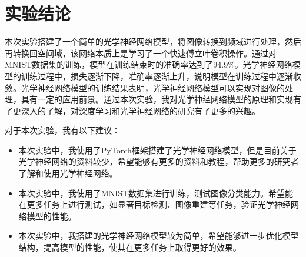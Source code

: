 \section{实验结论}

本次实验搭建了一个简单的光学神经网络模型，将图像转换到频域进行处理，然后再转换回空间域，该网络本质上是学习了一个快速傅立叶卷积操作。通过对MNIST数据集的训练，模型在训练结束时的准确率达到了94.9\%。光学神经网络模型的训练过程中，损失逐渐下降，准确率逐渐上升，说明模型在训练过程中逐渐收敛。光学神经网络模型的训练结果表明，光学神经网络模型可以实现对图像的处理，具有一定的应用前景。通过本次实验，我对光学神经网络模型的原理和实现有了更深入的了解，对深度学习和光学神经网络的研究有了更多的兴趣。

对于本次实验，我有以下建议：

\begin{itemize}
    \item 本次实验中，我使用了PyTorch框架搭建了光学神经网络模型，但是目前关于光学神经网络的资料较少，希望能够有更多的资料和教程，帮助更多的研究者了解和使用光学神经网络。
    \item 本次实验中，我使用了MNIST数据集进行训练，测试图像分类能力。希望能在更多任务上进行测试，如显著目标检测、图像重建等任务，验证光学神经网络模型的性能。
    \item 本次实验中，我搭建的光学神经网络模型较为简单，希望能够进一步优化模型结构，提高模型的性能，使其在更多任务上取得更好的效果。
\end{itemize}
